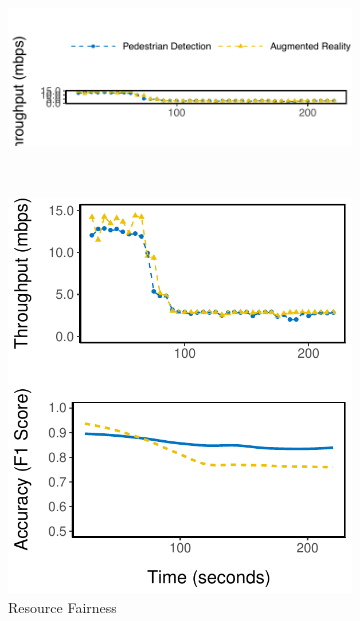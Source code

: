 \begin{figure}
  \begin{subfigure}[t]{0.9\columnwidth}
    \centering
    \includegraphics[width=\textwidth]{figures/multitask-legend.pdf}
  \end{subfigure}
  \\
  \vspace{1em}
  \begin{subfigure}[t]{0.49\columnwidth}
    \centering
    \includegraphics[width=\textwidth]{figures/multitask-eq-bw.pdf}
    \caption{Resource Fairness}
    \label{fig:eq-bw}
  \end{subfigure}
  \hfill
  \begin{subfigure}[t]{0.49\columnwidth}

\end{subfigure}
\end{figure}
